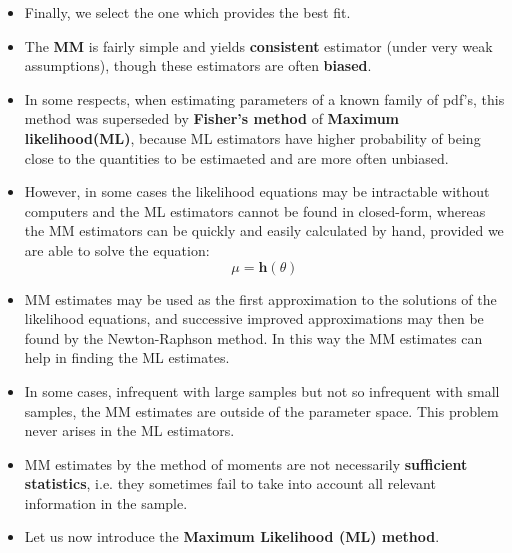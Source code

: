 \begin{itemize}
\begin{figure}[H]
    \label{fig:placeholder}
\end{figure}
    \[
    f_R(\mathbf{r}; \boldsymbol{\theta}) \;\rightarrow\; \hat{\boldsymbol{\theta}}_{MM} \;\rightarrow\; \hat{f}_R(r) = f_R\left(r; \hat{\boldsymbol{\theta}}_{MM}\right)
    \]
    \item Finally, we select the one which provides the best fit.
    \item The \textbf{MM} is fairly simple and yields \textbf{consistent} estimator (under very weak assumptions), though these estimators are often \textbf{biased}.
    \item In some respects, when estimating parameters of a known family of pdf's, this method was superseded by \textbf{Fisher's method} of \textbf{Maximum likelihood(ML)}, because ML estimators have higher probability of being close to the quantities to be estimaeted and are more often unbiased.
    \item However, in some cases the likelihood equations may be intractable without computers and the ML estimators cannot be found in closed-form, whereas the MM estimators can be quickly and easily calculated by hand, provided we are able to solve the equation:\[
    \mu = \textbf{h}(\theta)
    \]
    \item MM estimates may be used as the first approximation to the solutions of the likelihood equations, and successive improved approximations may then be found by the Newton-Raphson method. In this way the MM estimates can help in finding the ML estimates.
    \item In some cases, infrequent with large samples but not so infrequent with small samples, the MM estimates are outside of the parameter space. This problem never arises in the ML estimators.
    \item MM estimates by the method of moments are not necessarily \textbf{sufficient statistics}, i.e. they sometimes fail to take into account all relevant information in the sample.
    \item Let us now introduce the \textbf{Maximum Likelihood (ML) method}.
\end{itemize}
